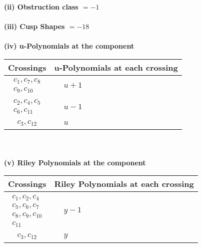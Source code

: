 \documentclass[1p]{elsarticle_modified}
\theoremstyle{definition}
\begin{document}
\flushleft \textbf{(ii) Obstruction class $= -1$}\\~\\
\flushleft \textbf{(iii) Cusp Shapes $= -18$}\\~\\
\newpage\renewcommand{\arraystretch}{1}
\flushleft \textbf{(iv) u-Polynomials at the component}\newline \\
\begin{tabular}{m{50pt}|m{274pt}}
Crossings & \hspace{64pt}u-Polynomials at each crossing \\
\hline $$\begin{aligned}c_{1},c_{7},c_{8}\\c_{9},c_{10}\end{aligned}$$&$\begin{aligned}
&u+1
\end{aligned}$\\
\hline $$\begin{aligned}c_{2},c_{4},c_{5}\\c_{6},c_{11}\end{aligned}$$&$\begin{aligned}
&u-1
\end{aligned}$\\
\hline $$\begin{aligned}c_{3},c_{12}\end{aligned}$$&$\begin{aligned}
&u
\end{aligned}$\\
\hline
\end{tabular}\\~\\
\newpage\renewcommand{\arraystretch}{1}
\flushleft \textbf{(v) Riley Polynomials at the component}\newline \\
\begin{tabular}{m{50pt}|m{274pt}}
Crossings & \hspace{64pt}Riley Polynomials at each crossing \\
\hline $$\begin{aligned}c_{1},c_{2},c_{4}\\c_{5},c_{6},c_{7}\\c_{8},c_{9},c_{10}\\c_{11}\end{aligned}$$&$\begin{aligned}
&y-1
\end{aligned}$\\
\hline $$\begin{aligned}c_{3},c_{12}\end{aligned}$$&$\begin{aligned}
&y
\end{aligned}$\\
\hline
\end{tabular}\\~\\
\end{document}
